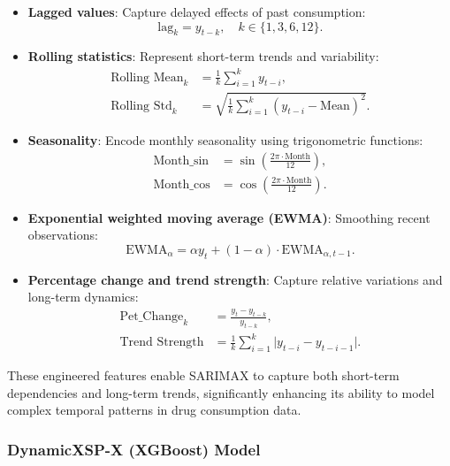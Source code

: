 \documentclass[journal]{IEEEtran}
\begin{document}
\begin{itemize}
    \item \textbf{Lagged values}: Capture delayed effects of past consumption:
    \begin{equation}
    \text{lag}_{k} = y_{t-k}, \quad k \in \{1, 3, 6, 12\}.
    \end{equation}
    
    \item \textbf{Rolling statistics}: Represent short-term trends and variability:
    \begin{align}
    \text{Rolling Mean}_{k} &= \frac{1}{k} \sum_{i=1}^{k} y_{t-i}, \\
    \text{Rolling Std}_{k} &= \sqrt{\frac{1}{k} \sum_{i=1}^{k} (y_{t-i} - \text{Mean})^2}.
    \end{align}
    
    \item \textbf{Seasonality}: Encode monthly seasonality using trigonometric functions:
    \begin{align}
    \text{Month\_sin} &= \sin\left(\frac{2\pi \cdot \text{Month}}{12}\right), \\
    \text{Month\_cos} &= \cos\left(\frac{2\pi \cdot \text{Month}}{12}\right).
    \end{align}
    
    \item \textbf{Exponential weighted moving average (EWMA)}: Smoothing recent observations:
    \begin{equation}
    \text{EWMA}_{\alpha} = \alpha y_{t} + (1-\alpha) \cdot \text{EWMA}_{\alpha,t-1}.
    \end{equation}
    
    \item \textbf{Percentage change and trend strength}: Capture relative variations and long-term dynamics:
    \begin{align}
    \text{Pet\_Change}_{k} &= \frac{y_{t} - y_{t-k}}{y_{t-k}}, \\
    \text{Trend Strength} &= \frac{1}{k} \sum_{i=1}^{k} \lvert y_{t-i} - y_{t-i-1} \rvert.
    \end{align}
\end{itemize}

These engineered features enable SARIMAX to capture both short-term dependencies and long-term trends, significantly enhancing its ability to model complex temporal patterns in drug consumption data.

\subsubsection{DynamicXSP-X (XGBoost) Model}
\end{document}
